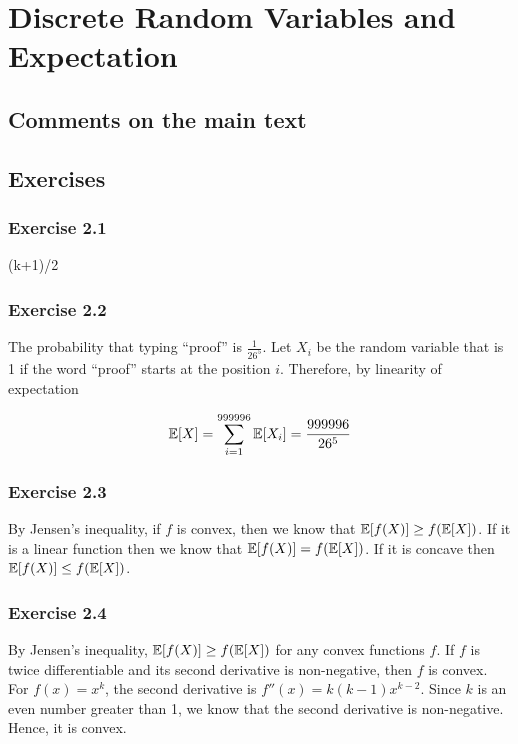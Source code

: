 \chapter{Discrete Random Variables and Expectation}

\section{Comments on the main text}

\section{Exercises}

\subsection*{Exercise 2.1}

(k+1)/2

\subsection*{Exercise 2.2}

The probability that typing ``proof'' is $\frac{1}{26^5}$. Let $X_i$ be the random variable
that is 1 if the word ``proof'' starts at the position $i$. Therefore, by linearity of 
expectation

\begin{equation*}
\mathbb{E}[X] = \sum_{i=1}^{999996} \mathbb{E}[X_i] = \frac{999996}{26^5}
\end{equation*}

\subsection*{Exercise 2.3}

By Jensen's inequality, if $f$ is convex, then we know that $\mathbb{E}[f(X)] \geq f(\mathbb{E}[X])$.
If it is a linear function then we know that $\mathbb{E}[f(X)] = f(\mathbb{E}[X])$. If it is concave
then $\mathbb{E}[f(X)] \leq f(\mathbb{E}[X])$.

\subsection*{Exercise 2.4}

By Jensen's inequality, $\mathbb{E}[f(X)] \geq f(\mathbb{E}[X])$ for any convex functions $f$. If
$f$ is twice differentiable and its second derivative is non-negative, then $f$ is convex. For
$f(x) = x^k$, the second derivative is $f''(x) = k(k-1)x^{k-2}$. Since $k$ is an even number greater
than 1, we know that the second derivative is non-negative. Hence, it is convex. 

